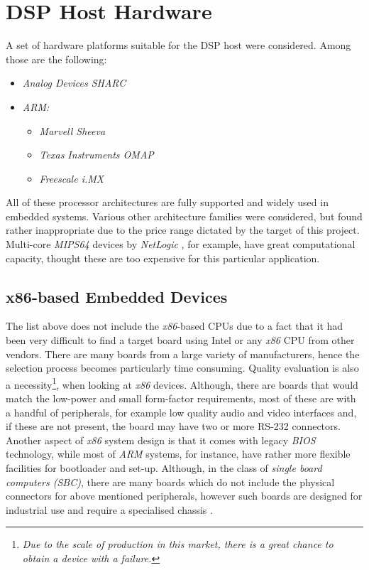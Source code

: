 \section{DSP Host Hardware}

  A set of hardware platforms suitable for the DSP host were
  considered. Among those are the following:
 	\begin{itemize}
		\item \emph{Analog Devices SHARC}
		\item \emph{ARM:} \begin{itemize}
		\item \emph{Marvell Sheeva}
		\item \emph{Texas Instruments OMAP}
		\item \emph{Freescale i.MX}
		\end{itemize}
	\end{itemize}
 All of these processor architectures are fully supported and widely
 used in embedded systems. Various other architecture families were
 considered, but found rather inappropriate due to the price range
 dictated by the target of this project. Multi-core \emph{MIPS64}
 devices by \emph{NetLogic} \cite{links:netlogic:mips64}, for
 example, have great computational capacity, thought these are too
 expensive for this particular application.

\subsection{x86-based Embedded Devices}

  The list above does not include the \emph{x86}-based CPUs due to a
 fact that it had been very difficult to find a target board using
 Intel or any \emph{x86} CPU from other vendors. There are many boards
 from a large variety of manufacturers, hence the selection process
 becomes particularly time consuming. Quality evaluation is also a
 necessity\footnote{\emph{Due to the scale of production in this
 market, there is a great chance to obtain a device with a failure.}},
 when looking at \emph{x86} devices. Although, there are boards that
 would match the low-power and small form-factor requirements, most
 of these are with a handful of peripherals, for example low quality
 audio and video interfaces and, if these are not present, the board
 may have two or more RS-232 connectors. Another aspect of \emph{x86}
 system design is that it comes with legacy \emph{BIOS} technology,
 while most of \emph{ARM} systems, for instance, have rather more
 flexible facilities for bootloader and set-up. Although, in the class of
 \emph{single board computers (SBC)}, there are many boards which do
 not include the physical connectors for above mentioned peripherals,
 however such boards are designed for industrial use and require a
 specialised chassis \cite{links:linuxfordevices:guide}.

